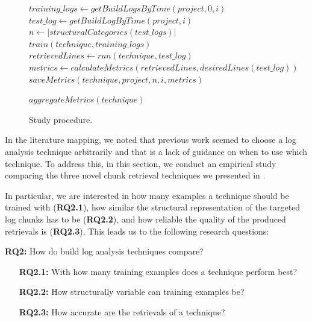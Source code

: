 \begin{figure}[tb]
\begin{algorithmic}[1]
   \State $training\_logs \gets getBuildLogsByTime(project, 0, i)$
   \State $test\_log \gets  getBuildLogByTime(project, i)$
   \State $n \gets |structuralCategories(test\_logs)|$
   \State
   \State $train(technique, training\_logs)$
       \State $retrievedLines \gets run(technique, test\_log)$
       \State $metrics \gets calculateMetrics(retrievedLines,
       desiredLines(test\_log))$
       \State
       \State $saveMetrics(technique, project, n, i, metrics)$

  \EndFor
 \EndFor
 \State $aggregateMetrics(technique)$
\EndFor
\end{algorithmic}

	\caption{Study procedure.}
	\label{fig:study}
\end{figure}




In the literature mapping, we noted that previous work seemed to choose
a log analysis technique arbitrarily and that is a lack of guidance on
when to use which technique.
To address this, in this section, we conduct an empirical study
comparing the three novel chunk retrieval techniques we presented in
.

In particular, we are interested in how many examples a technique
should be trained with (\textbf{RQ2.1}),
how similar the structural representation of the targeted log chunks
has to be (\textbf{RQ2.2}), and how reliable the quality of the
produced retrievals is (\textbf{RQ2.3}).
This leads us to the following research questions:

\begin{simplebox}[minipage boxed title*=-1.5cm,
attach boxed title to top center={yshift=-6mm}]
{\textbf{RQ2:} How do build log analysis techniques compare?}
\begin{itemize}[leftmargin=1.2cm]
  \item[\textbf{RQ2.1:}] With how many training examples does a
	technique perform best?
  \item[\textbf{RQ2.2:}] How structurally variable can training
  examples be?
  \item[\textbf{RQ2.3:}] How accurate are the retrievals of a technique?
\end{itemize}
\end{simplebox}

